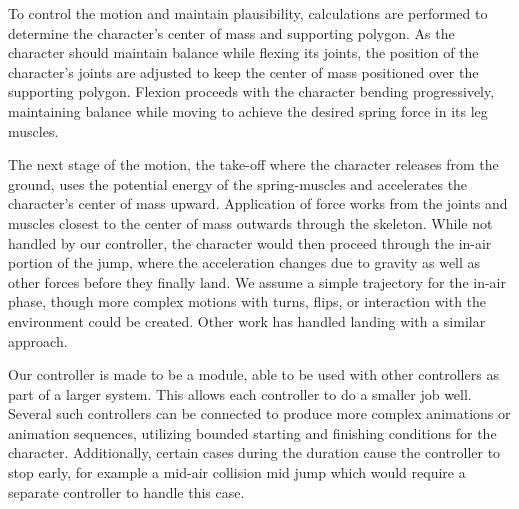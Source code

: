To control the motion and maintain plausibility, calculations are performed to determine the character's center of mass and supporting polygon.  As the character should maintain balance while flexing its joints, the position of the character's joints are adjusted to keep the center of mass positioned over the supporting polygon.  Flexion proceeds with the character bending progressively, maintaining balance while moving to achieve the desired spring force in its leg muscles.

The next stage of the motion, the take-off where the character releases from the ground, uses the potential energy of the spring-muscles and accelerates the character's center of mass upward.  Application of force works from the joints and muscles closest to the center of mass outwards through the skeleton.  While not handled by our controller, the character would then proceed through the in-air portion of the jump, where the acceleration changes due to gravity as well as other forces before they finally land.  We assume a simple trajectory for the in-air phase, though more complex motions with turns, flips, or interaction with the environment could be created.  Other work has handled landing with a similar approach. \cite{falling_landing}

Our controller is made to be a module, able to be used with other controllers as part of a larger system.  This allows each controller to do a smaller job well. Several such controllers can be connected to produce more complex animations or animation sequences, utilizing bounded starting and finishing conditions for the character. Additionally, certain cases during the duration cause the controller to stop early, for example a mid-air collision mid jump which would require a separate controller to handle this case. \cite{composable_controllers}


 
